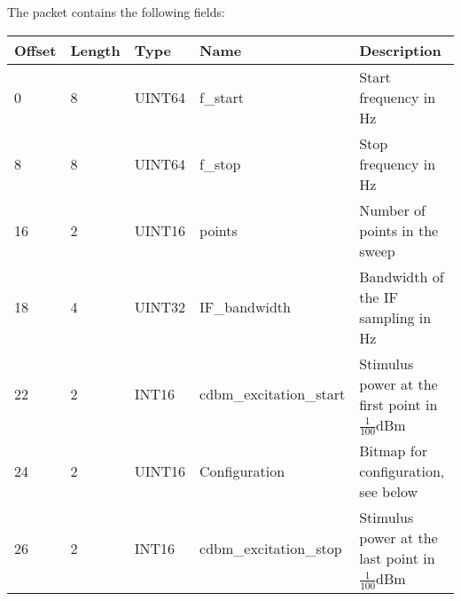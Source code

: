 \documentclass[a4paper,11pt]{article}
\begin{document}
The packet contains the following fields:
\begin{ThreePartTable}
\setlength\tabcolsep{3pt}

\begin{longtable}{p{} |  p{}  |  p{}| p{} | p{}}
\toprule
\textbf{Offset} &\textbf{Length} &\textbf{Type} & \textbf{Name} &\textbf{Description} \\ 
\hline
\endhead
\midrule[\heavyrulewidth]
\endfoot  
\midrule[\heavyrulewidth]
\endlastfoot

0 & 8 & UINT64 & f\_start & Start frequency in Hz \\
8 & 8 & UINT64 & f\_stop & Stop frequency in Hz \\
16 & 2 & UINT16 & points & Number of points in the sweep \\
18 & 4 & UINT32 & IF\_bandwidth & Bandwidth of the IF sampling in Hz \\
22 & 2 &  INT16 &cdbm\_excitation\_start &  Stimulus power at the first point in $\frac{1}{100}$dBm \\
24 & 2 & UINT16 & Configuration & Bitmap for configuration, see below \\
26 & 2 &  INT16 &cdbm\_excitation\_stop & Stimulus power at the last point in $\frac{1}{100}$dBm \\
\end{longtable}   
\end{ThreePartTable}
\end{document}
